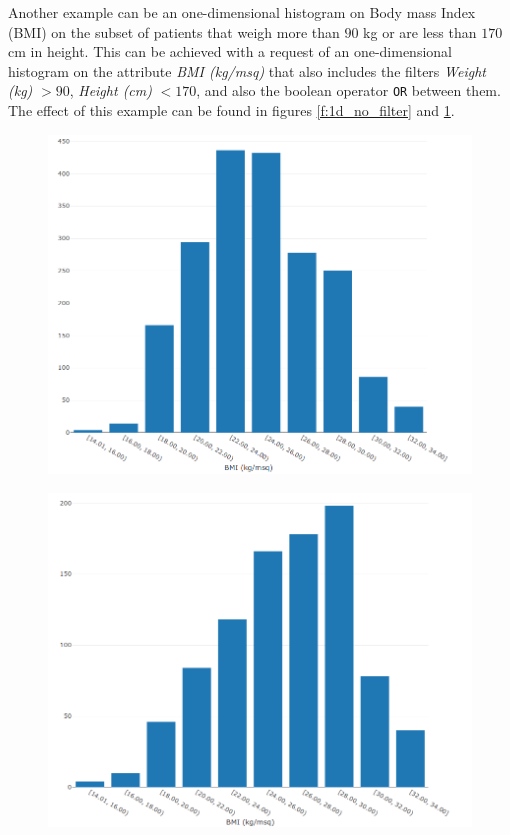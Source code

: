 Another example can be an one\hyp dimensional histogram on Body mass Index (BMI) on the subset of patients that weigh more than $90$ kg or are less than $170$ cm in height.
This can be achieved with a request of an one\hyp dimensional histogram on the attribute \textit{BMI (kg/msq)} that also includes the filters \textit{Weight (kg)} $ > 90$, \textit{Height (cm)} $ < 170$, and also the boolean operator \texttt{OR} between them.
The effect of this example can be found in figures \ref{f:1d_no_filter} and \ref{f:1d_filter}.

\begin{figure}
\centering
\begin{minipage}{.5\textwidth}
  \centering
  \includegraphics[width=\columnwidth]{figures/1d_no_filter.png}
  \label{f:1d_no_filter}
\end{minipage}%
\begin{minipage}{.5\textwidth}
  \centering
  \includegraphics[width=\columnwidth]{figures/1d_filter.png}
  \label{f:1d_filter}
\end{minipage}
\end{figure}

